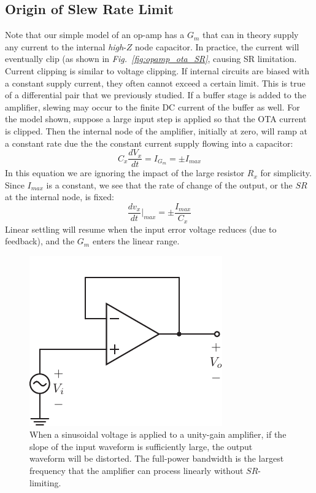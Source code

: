 \subsection{Origin of Slew Rate Limit}
Note that our simple model of an op-amp has a $G_m$ that can in theory supply any current to the internal \textit{high}-$Z$ node capacitor. In practice, the current will eventually clip (as shown in \emph{Fig.~\ref{fig:opamp_ota_SR}}, causing SR limitation.  Current clipping is similar to voltage clipping. If internal circuits are biased with a constant supply current, they often cannot exceed a certain limit.  This is true of a differential pair that we previously studied.  If a buffer stage is added to the amplifier, slewing may occur to the finite DC current of the buffer as well.  For the model shown, suppose a large input step is applied so that the OTA current is clipped.  Then the internal node of the amplifier, initially at zero, will ramp at a constant rate due the the constant current supply flowing into a capacitor:
    \begin{equation}
        C_x \frac{dV_x}{dt} = I_{G_m} = \pm I_{max}
    \end{equation}
In this equation we are ignoring the impact of the large resistor $R_x$ for simplicity.  Since $I_{max}$ is a constant, we see that the rate of change of the output, or the $SR$ at the internal node, is fixed:
    \begin{equation}
        \frac{dv_x}{dt} \bigg\rvert_{max} = \pm \frac{I_{max}}{C_x}
    \end{equation}
Linear settling will resume when the input error voltage reduces (due to feedback), and the $G_m$ enters the linear range.
\begin{figure}[t]
\centering
\includegraphics[scale=1]{opamp_unitygain}
\caption{When a sinusoidal voltage is applied to a unity-gain amplifier, if the slope of the input waveform is sufficiently large, the output waveform will be distorted.  The full-power bandwidth is the largest frequency that the amplifier can process linearly without $SR$-limiting.}
\label{fig:opamp_unitygain_fig}
\end{figure}
